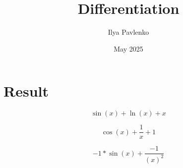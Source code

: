 \documentclass{article}
\title{Differentiation}
\author{Ilya Pavlenko}
\date{May 2025}
\begin{document}
\maketitle
\section{Result}

\begin {equation}
\sin(x) + \ln(x) + x
\end {equation}


\begin {equation}
\cos(x) + \frac {1} {x} + 1
\end {equation}


\begin {equation}
-1 * \sin(x) + \frac {-1} {(x) ^ {2}}
\end {equation}
\end{document}
